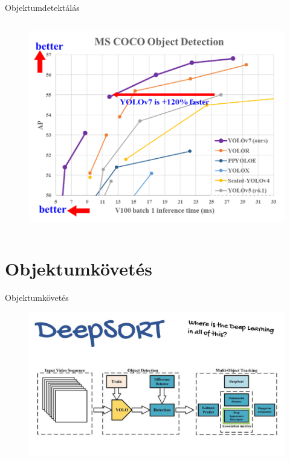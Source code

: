 \documentclass{beamer}
\begin{document}
\begin{frame}{Objektumdetektálás}
\begin{columns}
        \centering
        \begin{figure}
            \includegraphics[scale=0.35]{../performance.png}
        \end{figure}
    \end{columns}
\end{frame}

\section{Objektumkövetés}
\begin{frame}{Objektumkövetés}
    \centering
    \begin{figure}
        \includegraphics[scale=0.25]{deepsort_flowchart.jpg} 
    \end{figure}
\end{frame}
\end{document}
